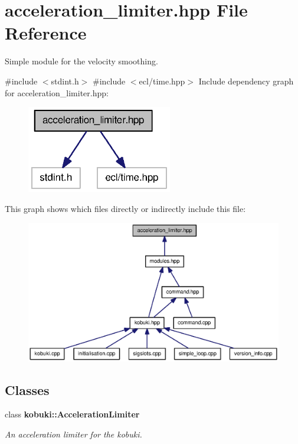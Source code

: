 \section{acceleration\-\_\-limiter.\-hpp \-File \-Reference}
\label{acceleration__limiter_8hpp}


\-Simple module for the velocity smoothing.  


{\ttfamily \#include $<$stdint.\-h$>$}\*
{\ttfamily \#include $<$ecl/time.\-hpp$>$}\*
\-Include dependency graph for acceleration\-\_\-limiter.\-hpp\-:
\nopagebreak
\begin{figure}[H]
\begin{center}
\leavevmode
\includegraphics[width=180pt]{acceleration__limiter_8hpp__incl}
\end{center}
\end{figure}
\-This graph shows which files directly or indirectly include this file\-:
\nopagebreak
\begin{figure}[H]
\begin{center}
\leavevmode
\includegraphics[width=350pt]{acceleration__limiter_8hpp__dep__incl}
\end{center}
\end{figure}
\subsection*{\-Classes}
\begin{DoxyCompactItemize}
\item 
class {\bf kobuki\-::\-Acceleration\-Limiter}
\begin{DoxyCompactList}\small\item\em \-An acceleration limiter for the kobuki. \end{DoxyCompactList}\end{DoxyCompactItemize}
